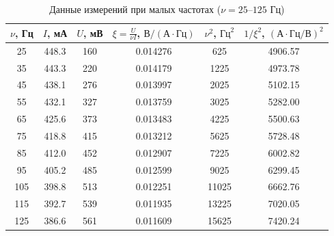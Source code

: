 \documentclass[12pt]{extarticle}
\begin{document}
		\begin{table}[H]
		\centering
		\caption{Данные измерений при малых частотах ($\nu = 25\text{--}125\text{ Гц}$)}
		\label{tab:low_amp}
		\begin{tabular}{cccccc}
			\toprule
			$\nu$, Гц & $I$, мА & $U$, мВ & $\xi = \frac{U}{\nu I}$, $\text{В}/(\text{А}\cdot\text{Гц})$ & $\nu^2$, $\text{Гц}^2$ & $1/\xi^2$, $(\text{А}\cdot\text{Гц}/\text{В})^2$ \\
			\midrule
			25  & 448.3 & 160 & 0.014276 & 625   & 4906.57 \\
			35  & 443.3 & 220 & 0.014179 & 1225  & 4973.78 \\
			45  & 438.1 & 276 & 0.013997 & 2025  & 5102.15 \\
			55  & 432.1 & 327 & 0.013759 & 3025  & 5282.00 \\
			65  & 425.6 & 373 & 0.013483 & 4225  & 5500.63 \\
			75  & 418.8 & 415 & 0.013212 & 5625  & 5728.48 \\
			85  & 412.0 & 452 & 0.012907 & 7225  & 6002.82 \\
			95  & 405.2 & 485 & 0.012599 & 9025  & 6299.45 \\
			105 & 398.8 & 513 & 0.012251 & 11025 & 6662.76 \\
			115 & 392.7 & 539 & 0.011935 & 13225 & 7020.05 \\
			125 & 386.6 & 561 & 0.011609 & 15625 & 7420.24 \\
			\bottomrule
		\end{tabular}
	\end{table}
	
\end{document}
